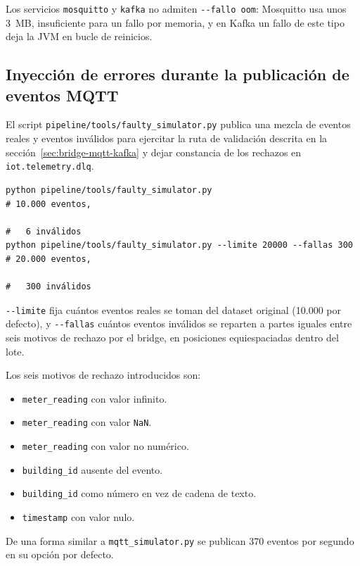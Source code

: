 Los servicios \texttt{mosquitto} y \texttt{kafka} no admiten \texttt{-{}-fallo oom}: Mosquitto usa unos 3~MB, insuficiente para un fallo por memoria, y en Kafka un fallo de este tipo deja la JVM en bucle de reinicios.

\subsection{Inyección de errores durante la publicación de eventos MQTT}

El script \texttt{pipeline/tools/faulty\_simulator.py} publica una mezcla de eventos reales y eventos inválidos para ejercitar la ruta de validación descrita en la sección~\ref{sec:bridge-mqtt-kafka} y dejar constancia de los rechazos en \texttt{iot.telemetry.dlq}.

{\footnotesize
\begin{verbatim}
python pipeline/tools/faulty_simulator.py                              # 10.000 eventos, 
                                                                       #   6 inválidos
python pipeline/tools/faulty_simulator.py --limite 20000 --fallas 300  # 20.000 eventos, 
                                                                       #   300 inválidos
\end{verbatim}
}

\texttt{-{}-limite} fija cuántos eventos reales se toman del dataset original (10.000 por defecto), y \texttt{-{}-fallas} cuántos eventos inválidos se reparten a partes iguales entre seis motivos de rechazo por el bridge, en posiciones equiespaciadas dentro del lote. 

Los seis motivos de rechazo introducidos son:

\begin{itemize}
  \item \texttt{meter\_reading} con valor infinito.
  \item \texttt{meter\_reading} con valor \texttt{NaN}.
  \item \texttt{meter\_reading} con valor no numérico.
  \item \texttt{building\_id} ausente del evento.
  \item \texttt{building\_id} como número en vez de cadena de texto.
  \item \texttt{timestamp} con valor nulo.
\end{itemize}

De una forma similar a \texttt{mqtt\_simulator.py} se publican 370 eventos por segundo en su opción por defecto.

